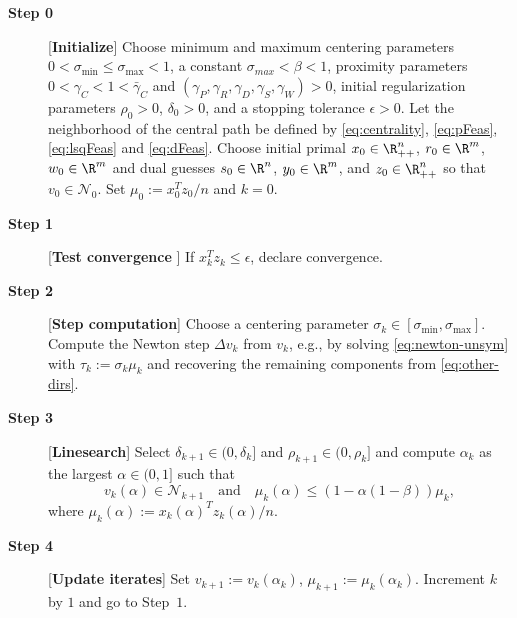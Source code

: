 \documentclass{amsart}
\begin{document}
\begin{algorithm}[htbp]
  \caption{%
    Primal-Dual Regularized Interior-Point Algorithm
    \label{alg:pd-reg}
  }
  \begin{description}
    \item[\textbf{Step 0}] [{\bf Initialize}] Choose minimum and maximum
      centering parameters $0 < \sigma_{\min} \leq \sigma_{\max} < 1$, a
      constant $\sigma_{max} < \beta < 1$, proximity parameters $0 < \gamma_C <
      1 < \bar{\gamma}_C$ and $(\gamma_P,\gamma_R,\gamma_D,\gamma_S,\gamma_W) >
      0$, initial regularization parameters $\rho_0 > 0$, $\delta_0 > 0$, and a
      stopping tolerance $\epsilon > 0$. Let the neighborhood of the central
      path be defined by \eqref{eq:centrality}, \eqref{eq:pFeas},
      \eqref{eq:lsqFeas} and \eqref{eq:dFeas}. Choose initial primal $x_0 \in
      \R_{++}^n$, $r_0 \in \R^m$, $w_0 \in \R^m$ and dual guesses $s_0 \in
      \R^n$, $y_0 \in \R^m$, and $z_0 \in \R_{++}^n$ so that $v_0 \in
      \mathcal{N}_0$. Set $\mu_0 := x_0^T z_0 / n$ and $k = 0$.
    \item[\textbf{Step 1}] [{\bf Test convergence }] If
      $x_k^T z_k \leq \epsilon$, declare convergence.
    \item[\textbf{Step 2}] [{\bf  Step  computation}] Choose a centering
      parameter $\sigma_k \in [\sigma_{\min},\sigma_{\max}]$. Compute the Newton
      step $\Delta v_k$ from $v_k$, e.g., by solving \eqref{eq:newton-unsym} with
      $\tau_k := \sigma_k \mu_k$ and
      recovering the remaining components from \eqref{eq:other-dirs}.
    \item[\textbf{Step 3}] [{\bf  Linesearch}] Select $\delta_{k+1} \in
      (0,\delta_k]$ and $\rho_{k+1} \in (0,\rho_k]$ and compute $\alpha_k$ as
      the largest $\alpha \in (0,1]$ such that
      \[
        v_k(\alpha) \in \mathcal{N}_{k+1}
        \quad \text{and} \quad
        \mu_k(\alpha) \leq (1 - \alpha (1-\beta)) \mu_k,
      \]
      where $\mu_k(\alpha) := x_k(\alpha)^T z_k(\alpha) / n$.
    \item[\textbf{Step 4}] [{\bf Update iterates}] Set
      $v_{k+1} := v_k(\alpha_k)$, $\mu_{k+1} := \mu_k(\alpha_k)$. Increment $k$
      by $1$ and go to Step~$1$.
  \end{description}
\end{algorithm}
\end{document}

